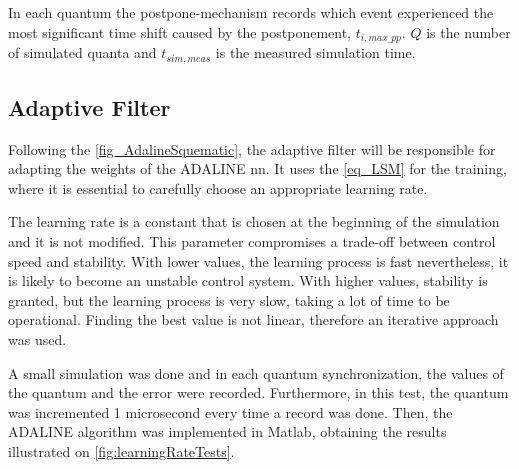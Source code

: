 In each quantum the postpone-mechanism records which event experienced the most significant time shift caused by the postponement, $t_{i,max\_pp}$. $Q$ is the number of simulated quanta and $t_{sim,meas}$ is the measured simulation time. 


\subsection{Adaptive Filter}

Following the \autoref{fig_AdalineSquematic}, the adaptive filter will be responsible for adapting the weights of the ADALINE \gls{nn}. It uses the \autoref{eq_LSM} for the training, where it is essential to carefully choose an appropriate learning rate.

The learning rate is a constant that is chosen at the beginning of the simulation and it is not modified. This parameter compromises a trade-off between control speed and stability. With lower values, the learning process is fast nevertheless, it is likely to become an unstable control system. With higher values, stability is granted, but the learning process is very slow, taking a lot of time to be operational.
Finding the best value is not linear, therefore an iterative approach was used. 

A small simulation was done and in each quantum synchronization, the values of the quantum and the error were recorded. Furthermore, in this test, the quantum was incremented 1 microsecond every time a record was done. Then, the ADALINE algorithm was implemented in Matlab, obtaining the results illustrated on \autoref{fig:learningRateTests}.

